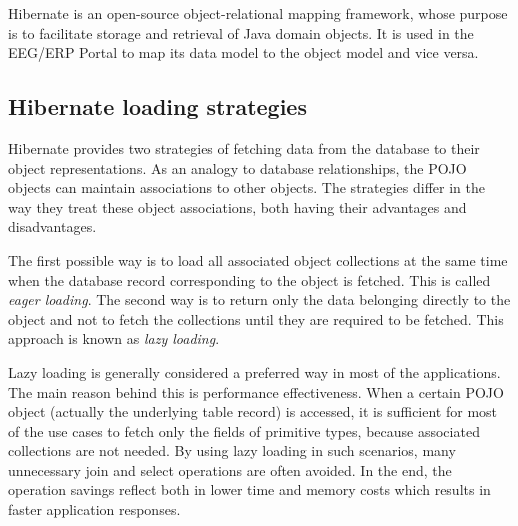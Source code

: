 Hibernate \cite{Hibernate:Home} is an open-source object-relational mapping framework, whose purpose is to facilitate storage and retrieval of Java domain objects. It is used in the EEG/ERP Portal to map its data model to the object model and vice versa.






\subsection{Hibernate loading strategies}


Hibernate provides two strategies of fetching data from the database to their object representations. 
As an analogy to database relationships, the POJO objects can maintain associations to other objects. 
The strategies differ in the way they treat these object associations, both having their advantages and disadvantages. 

The first possible way is to load all associated object collections at the same time when the database record corresponding to the object is fetched. 
This is called \textit{eager loading}. 
The second way is to return only the data belonging directly to the object and not to fetch the collections until they are required to be fetched. 
This approach is known as \textit{lazy loading}. 

Lazy loading is generally considered a preferred way in most of the applications.
The main reason behind this is performance effectiveness.
When a certain POJO object (actually the underlying table record) is accessed, it is sufficient for most of the use cases to fetch only the fields of primitive types, because associated collections are not needed. 
By using lazy loading in such scenarios, many unnecessary join and select operations are often avoided. 
In the end, the operation savings reflect both in lower time and memory costs which results in faster application responses. 

